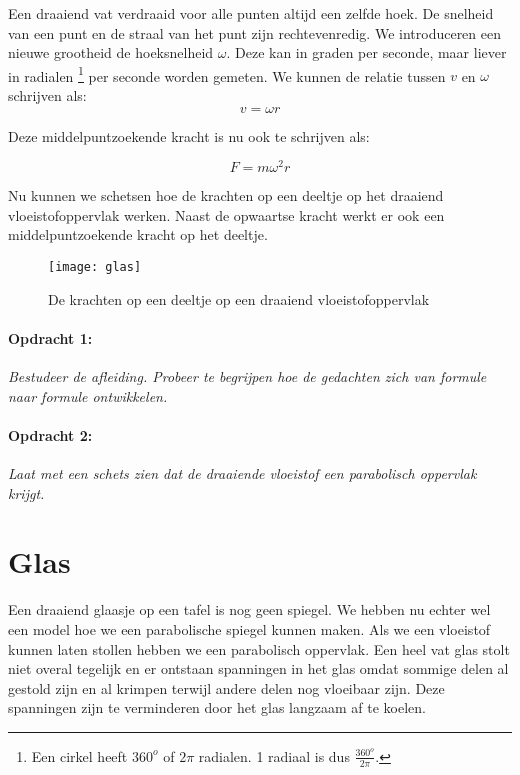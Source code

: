 Een draaiend vat verdraaid voor alle punten altijd een zelfde hoek. De
snelheid van een punt en de straal van het punt zijn rechtevenredig. We
introduceren een nieuwe grootheid de hoeksnelheid $\omega$. Deze kan in
graden per seconde, maar liever in radialen \footnote{Een cirkel heeft
$360^{o}$ of $2\pi$ radialen. 1 radiaal is dus $\frac{360^{o}}{2\pi}$.}
per seconde worden gemeten. We kunnen de relatie tussen $v$ en $\omega$
schrijven als: \begin{equation} v=\omega r \end{equation}


Deze middelpuntzoekende kracht is nu ook te schrijven als:

\begin{equation}
F=m\omega^{2}r
\end{equation}


Nu kunnen we schetsen hoe de krachten op een deeltje op het draaiend
vloeistofoppervlak werken. Naast de opwaartse kracht werkt er ook
een middelpuntzoekende kracht op het deeltje.

\begin{figure}[H]
\noindent \begin{centering}
\texttt{[image: glas]}
\par\end{centering}

\caption{De krachten op een deeltje op een draaiend vloeistofoppervlak}
\end{figure}


\paragraph*{Opdracht 1:}

\emph{Bestudeer de afleiding. Probeer te begrijpen hoe de gedachten
zich van formule naar formule ontwikkelen.}


\paragraph*{Opdracht 2:}

\emph{Laat met een schets zien dat de draaiende vloeistof een parabolisch
oppervlak krijgt. }


\section{Glas}

Een draaiend glaasje op een tafel is nog geen spiegel. We hebben nu
echter wel een model hoe we een parabolische spiegel kunnen maken.
Als we een vloeistof kunnen laten stollen hebben we een parabolisch
oppervlak. Een heel vat glas stolt niet overal tegelijk en er ontstaan
spanningen in het glas omdat sommige delen al gestold zijn en al krimpen
terwijl andere delen nog vloeibaar zijn. Deze spanningen zijn te verminderen
door het glas langzaam af te koelen.

